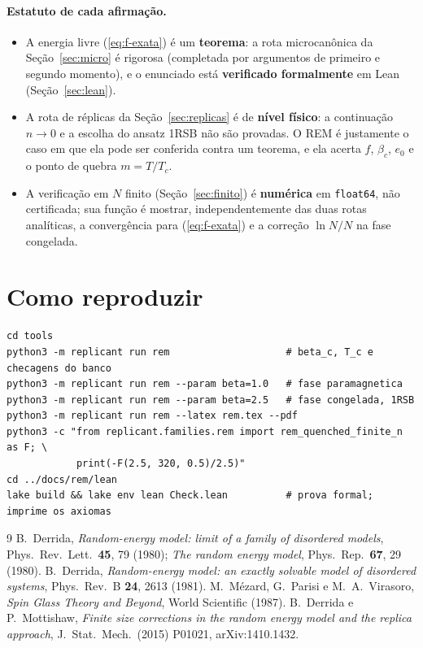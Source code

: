 \documentclass[11pt,a4paper]{article}
\begin{document}
\paragraph{Estatuto de cada afirmação.}
\begin{itemize}
\item A energia livre (\ref{eq:f-exata}) é um \textbf{teorema}: a rota microcanônica da
Seção~\ref{sec:micro} é rigorosa (completada por argumentos de primeiro e segundo momento), e o
enunciado está \textbf{verificado formalmente} em Lean (Seção~\ref{sec:lean}).
\item A rota de réplicas da Seção~\ref{sec:replicas} é de \textbf{nível físico}: a continuação $n\to0$
e a escolha do ansatz 1RSB não são provadas. O REM é justamente o caso em que ela pode ser conferida
contra um teorema, e ela acerta $f$, $\beta_c$, $e_0$ e o ponto de quebra $m=T/T_c$.
\item A verificação em $N$ finito (Seção~\ref{sec:finito}) é \textbf{numérica} em \texttt{float64}, não
certificada; sua função é mostrar, independentemente das duas rotas analíticas, a convergência para
(\ref{eq:f-exata}) e a correção $\ln N/N$ na fase congelada.
\end{itemize}

\section{Como reproduzir}
\begin{verbatim}
cd tools
python3 -m replicant run rem                    # beta_c, T_c e checagens do banco
python3 -m replicant run rem --param beta=1.0   # fase paramagnetica
python3 -m replicant run rem --param beta=2.5   # fase congelada, 1RSB
python3 -m replicant run rem --latex rem.tex --pdf
python3 -c "from replicant.families.rem import rem_quenched_finite_n as F; \
            print(-F(2.5, 320, 0.5)/2.5)"
cd ../docs/rem/lean
lake build && lake env lean Check.lean          # prova formal; imprime os axiomas
\end{verbatim}

\begin{thebibliography}{9}
 B.~Derrida, \emph{Random-energy model: limit of a family of disordered models},
Phys.\ Rev.\ Lett.\ \textbf{45}, 79 (1980); \emph{The random energy model}, Phys.\ Rep.\ \textbf{67}, 29 (1980).
\bibitem{derrida81} B.~Derrida, \emph{Random-energy model: an exactly solvable model of disordered systems},
Phys.\ Rev.\ B \textbf{24}, 2613 (1981).
 M.~Mézard, G.~Parisi e M.~A.~Virasoro, \emph{Spin Glass Theory and Beyond}, World Scientific (1987).
\bibitem{derrida-mottishaw} B.~Derrida e P.~Mottishaw, \emph{Finite size corrections in the random energy
model and the replica approach}, J.\ Stat.\ Mech.\ (2015) P01021, arXiv:1410.1432.
\end{thebibliography}
\end{document}

